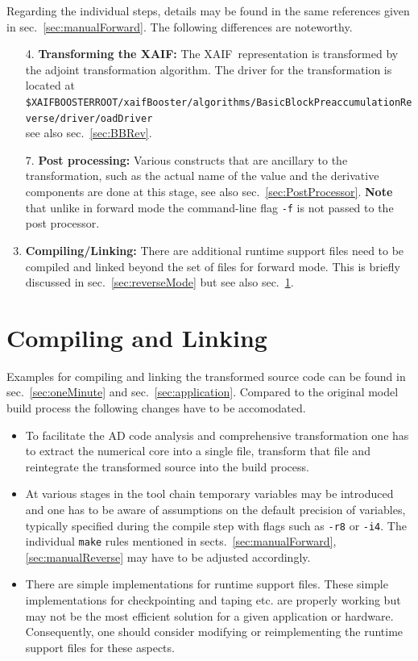 \documentclass{book}
\newcommand{\xaif}{XAIF}
\newcommand{\refsec}[1]{{sec.~\ref{#1}}}
\newcommand{\refsecs}[2]{{sects.~\ref{#1},\ref{#2}}}
\begin{document}
Regarding the individual steps, details may be found in the same references given in \refsec{sec:manualForward}.
The following differences are noteworthy.
\begin{enumerate}
\item[4.]{\bf Transforming the XAIF:} The \xaif\ representation is transformed by 
the adjoint transformation algorithm. The driver for the transformation is located at\\[1ex] 
\hspace*{.3cm}\lstinline{$XAIFBOOSTERROOT/xaifBooster/algorithms/BasicBlockPreaccumulationReverse/driver/oadDriver} \\[1ex]%
see also \refsec{sec:BBRev}.
\item[7.] {\bf Post processing:} Various constructs that are ancillary to the transformation, 
such as the actual name of the value and the derivative components are done at this stage, 
see also \refsec{sec:PostProcessor}. 
{\bf Note} that unlike in forward mode the command-line flag \lstinline{-f} is not passed to 
the post processor.
\item[8.] {\bf Compiling/Linking:} There are additional runtime support files need to be compiled and linked 
beyond the set of files for forward mode. 
This is briefly discussed in \refsec{sec:reverseMode} but see also \refsec{sec:compLink}.
\end{enumerate}

\section{Compiling and Linking}\label{sec:compLink}
Examples for compiling and linking the transformed source code can be found in \refsec{sec:oneMinute} and 
\refsec{sec:application}.
Compared to the original model build process the following changes have to be accomodated.
\begin{itemize}
\item To facilitate the AD code analysis and comprehensive transformation 
one has to extract the numerical core into a single file, transform that file and reintegrate 
the transformed source into the build process. 
\item At various stages in the tool chain temporary variables may be introduced and one 
has to be aware of assumptions on the default precision of variables, typically specified during the 
compile step with flags such as \lstinline{-r8} or \lstinline{-i4}. The individual 
\lstinline{make} rules mentioned in \refsecs{sec:manualForward}{sec:manualReverse} 
may have to be adjusted accordingly.
\item There are simple implementations for runtime support files. These simple implementations 
for checkpointing and taping etc. are properly working but may not be the most efficient solution 
for a given application or hardware.  
Consequently, one should consider modifying or reimplementing the runtime support files for 
these aspects.
\end{itemize}
\end{document}

